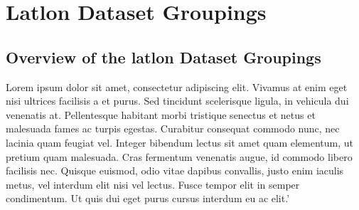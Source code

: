 \pagebreak
\section{Latlon Dataset Groupings}
\par\vspace{0.5cm}
\subsection{Overview of the latlon Dataset Groupings}
Lorem ipsum dolor sit amet, consectetur adipiscing elit. Vivamus at enim eget nisi ultrices facilisis a et purus. Sed tincidunt scelerisque ligula, in vehicula dui venenatis at. Pellentesque habitant morbi tristique senectus et netus et malesuada fames ac turpis egestas. Curabitur consequat commodo nunc, nec lacinia quam feugiat vel. Integer bibendum lectus sit amet quam elementum, ut pretium quam malesuada. Cras fermentum venenatis augue, id commodo libero facilisis nec. Quisque euismod, odio vitae dapibus convallis, justo enim iaculis metus, vel interdum elit nisi vel lectus. Fusce tempor elit in semper condimentum. Ut quis dui eget purus cursus interdum eu ac elit.'
\par\vspace{0.5cm}

